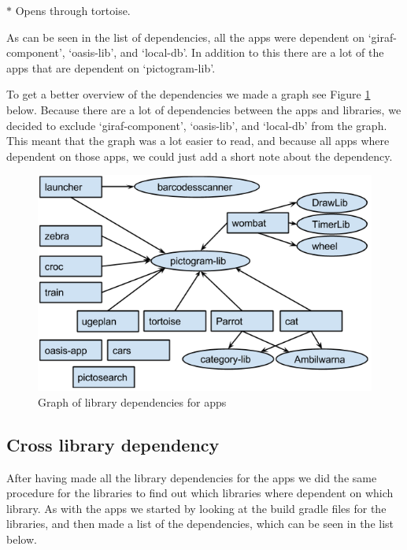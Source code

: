 $*$ Opens through tortoise.

As can be seen in the list of dependencies, all the apps were dependent on ‘giraf-component’, ‘oasis-lib’, and ‘local-db’. In addition to this there are a lot of the apps that are dependent on ‘pictogram-lib’.

To get a better overview of the dependencies we made a graph see Figure \ref{AppLibependencies} below. Because there are a lot of dependencies between the apps and libraries, we decided to exclude ‘giraf-component’, ‘oasis-lib’, and ‘local-db’ from the graph. This meant that the graph was a lot easier to read, and because all apps where dependent on those apps, we could just add a short note about the dependency.


\begin{figure}[H]
	\centering
	\includegraphics[width=0.8 \textwidth]{pictures/AppLibependencies.png}
	\caption{Graph of library dependencies for apps}
	\label{AppLibependencies}
\end{figure}

\subsection{Cross library dependency}
After having made all the library dependencies for the apps we did the same procedure for the libraries to find out which libraries where dependent on which library. As with the apps we started by looking at the build gradle files for the libraries, and then made a list of the dependencies, which can be seen in the list below.

